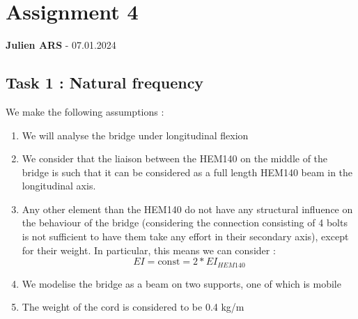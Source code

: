 \begin{Shaded}
\begin{Highlighting}[]
\OperatorTok{=}\OperatorTok{=}\NormalTok{)}




\end{Highlighting}
\end{Shaded}

\hypertarget{assignment-4}{%
\section{Assignment 4}\label{assignment-4}}

\textbf{Julien ARS} - 07.01.2024

\hypertarget{task-1--natural-frequency}{%
\subsection{Task 1 : Natural
frequency}\label{task-1--natural-frequency}}

We make the following assumptions :

\begin{enumerate}
\tightlist
\item
  We will analyse the bridge under longitudinal flexion
\item
  We consider that the liaison between the HEM140 on the middle of the
  bridge is such that it can be considered as a full length HEM140 beam
  in the longitudinal axis.
\item
  Any other element than the HEM140 do not have any structural influence
  on the behaviour of the bridge (considering the connection consisting
  of 4 bolts is not sufficient to have them take any effort in their
  secondary axis), except for their weight. In particular, this means we
  can consider : \[ EI = \text{const} = 2*EI_{HEM140} \]
\item
  We modelise the bridge as a beam on two supports, one of which is
  mobile
\item
  The weight of the cord is considered to be 0.4 kg/m
\end{enumerate}

